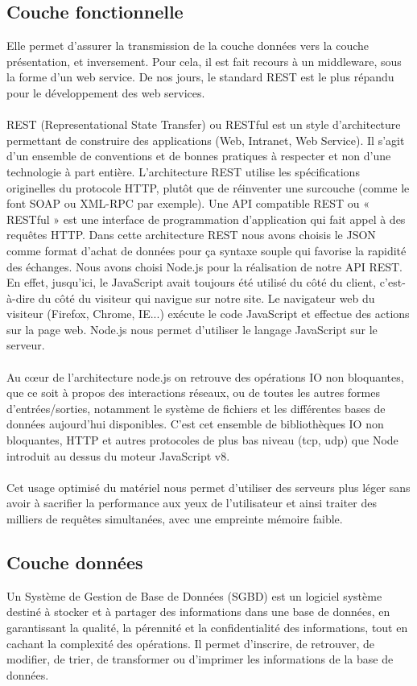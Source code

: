 \subsection{Couche fonctionnelle} 
Elle permet d’assurer la transmission de la couche données vers la couche présentation, et inversement. Pour cela, il est fait recours à un middleware, sous la forme d’un web service. De nos jours, le standard REST est le plus répandu pour le développement des web services.
\\$ $\\REST (Representational State Transfer) ou RESTful est un style d’architecture permettant de construire des applications (Web, Intranet, Web Service). Il s’agit d’un ensemble de conventions et de bonnes pratiques à respecter et non d’une technologie à part entière. L’architecture REST utilise les spécifications originelles du protocole HTTP, plutôt que de réinventer une surcouche (comme le font SOAP ou XML-RPC par exemple). Une API compatible REST ou « RESTful » est une interface de programmation d'application qui fait appel à des requêtes HTTP. Dans cette architecture REST nous avons choisis le JSON comme format d'achat de données pour ça syntaxe souple qui favorise la rapidité des échanges.
\newpage
Nous avons choisi Node.js pour la réalisation de notre API REST. En effet, jusqu'ici, le JavaScript avait toujours été utilisé du côté du client, c'est-à-dire du côté du visiteur qui navigue sur notre site. Le navigateur web du visiteur (Firefox, Chrome, IE...) exécute le code JavaScript et effectue des actions sur la page web. Node.js nous permet d'utiliser le langage JavaScript sur le serveur.
\\$ $\\Au cœur de l’architecture node.js on retrouve des opérations IO non bloquantes, que ce soit à propos des interactions réseaux, ou de toutes les autres formes d’entrées/sorties, notamment le système de fichiers et les différentes bases de données aujourd’hui disponibles. C’est cet ensemble de bibliothèques IO non bloquantes, HTTP et autres protocoles de plus bas niveau (tcp, udp) que Node introduit au dessus du moteur JavaScript v8.
\\$ $\\Cet usage optimisé du matériel nous permet d’utiliser des serveurs plus léger sans avoir à sacrifier la performance aux yeux de l’utilisateur et ainsi traiter des milliers de requêtes simultanées, avec une empreinte mémoire faible.

\subsection{Couche données} 
Un Système de Gestion de Base de Données (SGBD) est un logiciel système destiné à stocker et à partager des informations dans une base de données, en garantissant la qualité, la pérennité et la confidentialité des informations, tout en cachant la complexité des opérations. Il permet d'inscrire, de retrouver, de modifier, de trier, de transformer ou d'imprimer les informations de la base de données.

